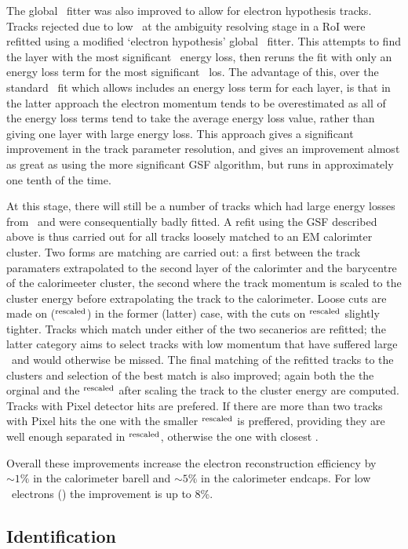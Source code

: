 The global \chisquared\
fitter was also improved to allow for electron hypothesis tracks. Tracks
rejected due to low \chisquared\ at the ambiguity resolving stage in a RoI were
refitted using a modified `electron hypothesis' global \chisquared\ fitter. This
attempts to find the layer with the most significant \brem\ energy loss, then
reruns the fit with only an energy loss term for the most significant \brem\
los. The advantage of this, over the standard \chisquared\ fit which allows
includes an energy loss term for each layer, is that in the latter approach the
electron momentum tends to be overestimated as all of the energy loss terms tend
to take the average energy loss value, rather than giving one layer with large
energy loss. This approach gives a significant improvement in the track
parameter resolution, and gives an improvement almost as great as using the more
significant GSF algorithm, but runs in approximately one tenth of the time.

At this stage, there will still be a number of tracks which had large energy
losses from \brem\ and were consequentially badly fitted. A refit using the GSF
described above is thus carried out for all tracks loosely matched to an
EM calorimter cluster. Two forms are matching are carried out: a first between the
track paramaters extrapolated to the second layer of the calorimter and the
barycentre of the calorimeeter cluster, the second where the track momentum is
scaled to the cluster energy before extrapolating the track to the calorimeter.
Loose cuts are made on \deltaR (\deltaR$^{\rm{rescaled}}$) in the former
(latter) case, with the cuts on \deltaR$^{\rm{rescaled}}$ slightly tighter.
Tracks which match under either of the two secanerios are refitted; the latter
category aims to select tracks with low momentum that have suffered large
\brem\ and would otherwise be missed. The final matching of the refitted tracks
to the clusters and selection of the best match is also improved; again both the
the orginal \deltaR and the \deltaR$^{\rm{rescaled}}$ after scaling the track to the cluster
energy are computed. Tracks with Pixel detector hits are prefered. If there are
more than two tracks with Pixel hits the one with the smaller
\deltaR$^{\rm{rescaled}}$ is preffered, providing they are well enough
separated in \deltaR$^{\rm{rescaled}}$, otherwise the one with closest \deltaR.

Overall these improvements increase the electron reconstruction efficiency by
$\sim 1\%$ in the calorimeter barell and $\sim 5\%$ in the calorimeter endcaps.
For low \et\ electrons (\etlt{20}) the improvement is up to 8\%.

\subsection{Identification}
\label{sec:reco-el-id}

